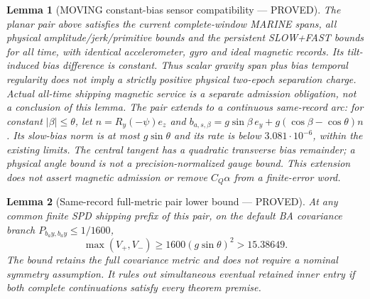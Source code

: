 \documentclass[journal]{IEEEtran}
\newtheorem{lemma}{Lemma}\newtheorem{theorem}{Theorem}\newtheorem{proposition}{Proposition}\newtheorem{remark}{Remark}\newtheorem{corollary}{Corollary}
\begin{document}
\begin{lemma}[MOVING constant-bias sensor compatibility --- PROVED]
The planar pair above satisfies the current complete-window MARINE spans,
all physical amplitude/jerk/primitive bounds and the persistent SLOW+FAST
bounds for all time, with identical accelerometer, gyro and ideal magnetic
records. Its tilt-induced bias difference is constant. Thus scalar gravity
span plus bias temporal regularity does not imply a strictly positive
physical two-epoch separation charge. Actual all-time shipping magnetic
service is a separate admission obligation, not a conclusion of this lemma.
The pair extends to a continuous same-record arc: for constant
$|\beta|\le\theta$, let $n=R_y(-\psi)e_z$ and
$b_{a,s,\beta}=g\sin\beta\,e_y+g(\cos\beta-\cos\theta)n$.
Its slow-bias norm is at most $g\sin\theta$ and its rate is below
$3.081\cdot10^{-6}$, within the existing limits. The central tangent has a
quadratic transverse bias remainder; a physical angle bound is not a
precision-normalized gauge bound. This extension does not assert magnetic
admission or remove $C_Q\alpha$ from a finite-error word.
\end{lemma}

\begin{lemma}[Same-record full-metric pair lower bound --- PROVED]
At any common finite SPD shipping prefix of this pair, on the default BA
covariance branch \(P_{b_ay,b_ay}\le1/1600\),
\[
\max(V_+,V_-)\ge1600(g\sin\theta)^2>15.38649.
\]
The bound retains the full covariance metric and does not require a nominal
symmetry assumption. It rules out simultaneous eventual retained inner
entry if both complete continuations satisfy every theorem premise.
\end{lemma}
\end{document}
